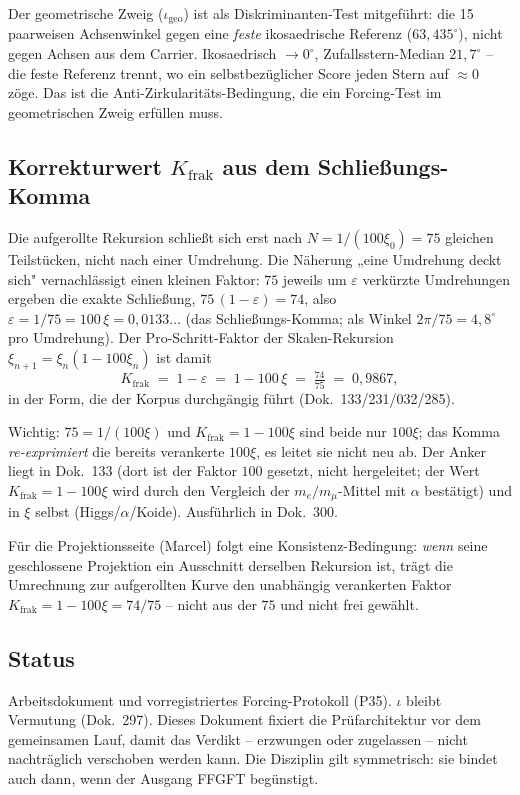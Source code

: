 Der geometrische Zweig ($\iota_{\text{geo}}$) ist als Diskriminanten-Test
mitgeführt: die 15 paarweisen Achsenwinkel gegen eine \emph{feste}
ikosaedrische Referenz ($63{,}435^\circ$), nicht gegen Achsen aus dem Carrier.
Ikosaedrisch $\to 0^\circ$, Zufallsstern-Median $21{,}7^\circ$ -- die feste
Referenz trennt, wo ein selbstbezüglicher Score jeden Stern auf $\approx 0$
zöge. Das ist die Anti-Zirkularitäts-Bedingung, die ein Forcing-Test im
geometrischen Zweig erfüllen muss.

\subsection*{Korrekturwert $K_{\text{frak}}$ aus dem Schließungs-Komma}

Die aufgerollte Rekursion schließt sich erst nach $N=1/(100\xi_0)=75$ gleichen
Teilstücken, nicht nach einer Umdrehung. Die Näherung „eine Umdrehung deckt
sich" vernachlässigt einen kleinen Faktor: $75$ jeweils um $\varepsilon$
verkürzte Umdrehungen ergeben die exakte Schließung, $75\,(1-\varepsilon)=74$,
also $\varepsilon = 1/75 = 100\,\xi = 0{,}0133\ldots$ (das Schließungs-Komma;
als Winkel $2\pi/75 = 4{,}8^\circ$ pro Umdrehung). Der Pro-Schritt-Faktor der
Skalen-Rekursion $\xi_{n+1}=\xi_n(1-100\xi_n)$ ist damit
\[
  K_{\text{frak}} \;=\; 1 - \varepsilon \;=\; 1 - 100\,\xi \;=\; \tfrac{74}{75}
  \;=\; 0{,}9867,
\]
in der Form, die der Korpus durchgängig führt (Dok.~133/231/032/285).

Wichtig: $75=1/(100\xi)$ und $K_{\text{frak}}=1-100\xi$ sind beide nur $100\xi$;
das Komma \emph{re-exprimiert} die bereits verankerte $100\xi$, es leitet sie
nicht neu ab. Der Anker liegt in Dok.~133 (dort ist der Faktor $100$ gesetzt, nicht
hergeleitet; der Wert $K_{\text{frak}}=1-100\xi$ wird durch den Vergleich der
$m_e/m_\mu$-Mittel mit $\alpha$ bestätigt) und in $\xi$ selbst
(Higgs/$\alpha$/Koide). Ausführlich in Dok.~300.

Für die Projektionsseite (Marcel) folgt eine Konsistenz-Bedingung: \emph{wenn}
seine geschlossene Projektion ein Ausschnitt derselben Rekursion ist, trägt die
Umrechnung zur aufgerollten Kurve den unabhängig verankerten Faktor
$K_{\text{frak}}=1-100\xi=74/75$ -- nicht aus der $75$ und nicht frei gewählt.

\subsection*{Status}

Arbeitsdokument und vorregistriertes Forcing-Protokoll (P35). $\iota$ bleibt
Vermutung (Dok.~297). Dieses Dokument fixiert die Prüfarchitektur vor dem
gemeinsamen Lauf, damit das Verdikt -- erzwungen oder zugelassen -- nicht
nachträglich verschoben werden kann. Die Disziplin gilt symmetrisch: sie
bindet auch dann, wenn der Ausgang FFGFT begünstigt.
